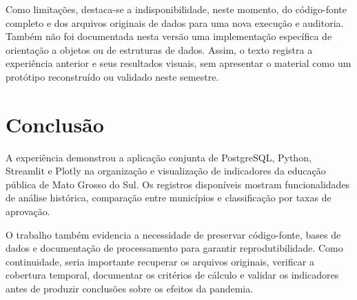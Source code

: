 \documentclass[preprint,10pt,5p]{elsarticle}
\begin{document}
Como limitações, destaca-se a indisponibilidade, neste momento, do código-fonte completo e dos arquivos originais de dados para uma nova execução e auditoria. Também não foi documentada nesta versão uma implementação específica de orientação a objetos ou de estruturas de dados. Assim, o texto registra a experiência anterior e seus resultados visuais, sem apresentar o material como um protótipo reconstruído ou validado neste semestre.

\section{Conclusão}
A experiência demonstrou a aplicação conjunta de PostgreSQL, Python, Streamlit e Plotly na organização e visualização de indicadores da educação pública de Mato Grosso do Sul. Os registros disponíveis mostram funcionalidades de análise histórica, comparação entre municípios e classificação por taxas de aprovação.

O trabalho também evidencia a necessidade de preservar código-fonte, bases de dados e documentação de processamento para garantir reprodutibilidade. Como continuidade, seria importante recuperar os arquivos originais, verificar a cobertura temporal, documentar os critérios de cálculo e validar os indicadores antes de produzir conclusões sobre os efeitos da pandemia.
\end{document}
